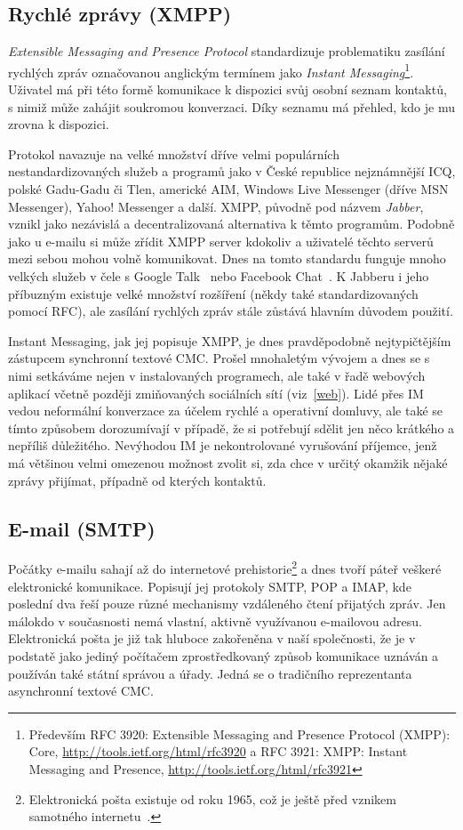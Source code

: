 \documentclass[12pt,oneside,final]{fithesis2}
\begin{document}
\subsection{Rychlé zprávy (XMPP)}\label{xmpp}
\emph{Extensible Messaging and Presence Protocol} standardizuje problematiku zasílání rychlých zpráv označovanou anglickým termínem jako \emph{Instant Messaging}\footnote{Především RFC 3920: Extensible Messaging and Presence Protocol (XMPP): Core, \url{http://tools.ietf.org/html/rfc3920} a RFC 3921: XMPP: Instant Messaging and Presence, \url{http://tools.ietf.org/html/rfc3921}}. Uživatel má při této formě komunikace k dispozici svůj osobní seznam kontaktů, s nimiž může zahájit soukromou konverzaci. Díky seznamu má přehled, kdo je mu zrovna k dispozici.

Protokol navazuje na velké množství dříve velmi populárních nestandardizovaných služeb a programů jako v České republice nejznámnější ICQ, polské Gadu-Gadu či Tlen, americké AIM, Windows Live Messenger (dříve MSN Messenger), Yahoo! Messenger a další. XMPP, původně pod názvem \emph{Jabber}, vznikl jako nezávislá a decentralizovaná alternativa k těmto programům. Podobně jako u e-mailu si může zřídit XMPP server kdokoliv a uživatelé těchto serverů mezi sebou mohou volně komunikovat. Dnes na tomto standardu funguje mnoho velkých služeb v čele s Google Talk~\cite{bau2005google} nebo Facebook Chat~\cite{reiss2010facebook}. K Jabberu i jeho příbuzným existuje velké množství rozšíření (někdy také standardizovaných pomocí RFC), ale zasílání rychlých zpráv stále zůstává hlavním důvodem použití.

Instant Messaging, jak jej popisuje XMPP, je dnes pravděpodobně nejtypičtějším zástupcem synchronní textové CMC. Prošel mnohaletým vývojem a dnes se s nimi setkáváme nejen v instalovaných programech, ale také v řadě webových aplikací včetně později zmiňovaných sociálních sítí (viz~\ref{web}). Lidé přes IM vedou neformální konverzace za účelem rychlé a operativní domluvy, ale také se tímto způsobem dorozumívají v případě, že si potřebují sdělit jen něco krátkého a nepříliš důležitého. Nevýhodou IM je nekontrolované vyrušování příjemce, jenž má většinou velmi omezenou možnost zvolit si, zda chce v určitý okamžik nějaké zprávy přijímat, případně od kterých kontaktů.

\subsection{E-mail (SMTP)}\label{email}
Počátky e-mailu sahají až do internetové prehistorie\footnote{Elektronická pošta existuje od roku 1965, což je ještě před vznikem samotného internetu~\cite{vanvleck2012electronic}.} a dnes tvoří páteř veškeré elektronické komunikace. Popisují jej protokoly SMTP, POP a IMAP, kde poslední dva řeší pouze různé mechanismy vzdáleného čtení přijatých zpráv. Jen málokdo v současnosti nemá vlastní, aktivně využívanou e-mailovou adresu. Elektronická pošta je již tak hluboce zakořeněna v naší společnosti, že je v podstatě jako jediný počítačem zprostředkovaný způsob komunikace uznáván a používán také státní správou a úřady. Jedná se o tradičního reprezentanta asynchronní textové CMC.
\end{document}
